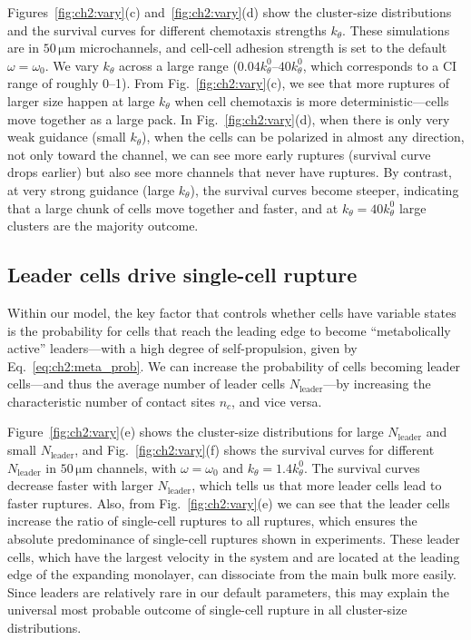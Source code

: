 Figures~\ref{fig:ch2:vary}(c) and~\ref{fig:ch2:vary}(d) show the cluster-size distributions and the survival curves for different chemotaxis strengths $k_\theta$.
These simulations are in $50\,\mathrm{\mu m}$ microchannels, and cell-cell adhesion strength is set to the default $\omega=\omega_0$.
We vary $k_\theta$ across a large range ($0.04k_\theta^0$--$40k_\theta^0$, which corresponds to a CI range of roughly 0--1).
From Fig.~\ref{fig:ch2:vary}(c), we see that more ruptures of larger size happen at large $k_\theta$ when cell chemotaxis is more deterministic---cells move together as a large pack.
In Fig.~\ref{fig:ch2:vary}(d), when there is only very weak guidance (small $k_\theta$), when the cells can be polarized in almost any direction, not only toward the channel, we can see more early ruptures (survival curve drops earlier) but also see more channels that never have ruptures.
By contrast, at very strong guidance (large $k_\theta$), the survival curves become steeper, indicating that a large chunk of cells move together and faster, and at $k_\theta = 40 k_\theta^0$ large clusters are the majority outcome.


\subsection{Leader cells drive single-cell rupture}
\label{sec:ch2:meta}

Within our model, the key factor that controls whether cells have variable states is the probability for cells that reach the leading edge to become ``metabolically active'' leaders---with a high degree of self-propulsion, given by Eq.~\eqref{eq:ch2:meta_prob}.
We can increase the probability of cells becoming leader cells---and thus the average number of leader cells $N_{\textrm{leader}}$---by increasing the characteristic number of contact sites $n_c$, and vice versa.

Figure~\ref{fig:ch2:vary}(e) shows the cluster-size distributions for large $N_\textrm{leader}$ and small $N_\textrm{leader}$, and Fig.~\ref{fig:ch2:vary}(f) shows the survival curves for different $N_\textrm{leader}$ in $50\,\mathrm{\mu m}$ channels, with $\omega=\omega_0$ and $k_\theta=1.4k_\theta^0$.
The survival curves decrease faster with larger $N_\textrm{leader}$, which tells us that more leader cells lead to faster ruptures.
Also, from Fig.~\ref{fig:ch2:vary}(e) we can see that the leader cells increase the ratio of single-cell ruptures to all ruptures, which ensures the absolute predominance of single-cell ruptures shown in experiments.
These leader cells, which have the largest velocity in the system and are located at the leading edge of the expanding monolayer, can dissociate from the main bulk more easily.
Since leaders are relatively rare in our default parameters, this may explain the universal most probable outcome of single-cell rupture in all cluster-size distributions.


